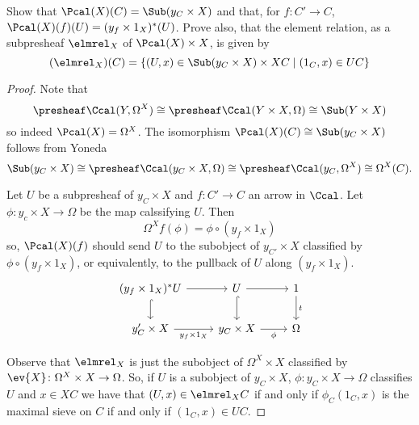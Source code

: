 \begin{exercise}{7}
    Show that $\Pcal(X)(C)=\Sub(y_C\times X)$ and that, for $f\colon C'\to C$, $\Pcal(X)(f)(U)=(y_f\times 1_X)^*(U)$. Prove also, that the element relation, as a subpresheaf $\elmrel_X$ of $\Pcal(X)\times X$, is given by
    \[ (\elmrel_X)(C)=\{(U,x)\in\Sub(y_C\times X)\times XC\mid (1_C,x)\in UC\} \]
\begin{solution}
    \begin{proof}
        Note that
        \[\presheaf\Ccal(Y,\Omega^X)\cong\presheaf\Ccal(Y\times X,\Omega)\cong\Sub(Y\times X)\]
        so indeed $\Pcal(X)=\Omega^X$. The isomorphism $\Pcal(X)(C)\cong\Sub(y_C\times X)$ follows from Yoneda
        \[\Sub(y_C\times X)\cong\presheaf\Ccal(y_C\times X,\Omega)\cong\presheaf\Ccal(y_C,\Omega^X)\cong\Omega^X(C).\]

        Let $U$ be a subpresheaf of $y_C\times X$ and $f\colon C'\to C$ an arrow in $\Ccal$. Let $\phi\colon y_c\times X\to\Omega$ be the map calssifying $U$. Then
        \[\Omega^Xf(\phi)=\phi\circ (y_f\times 1_X)\]
        so, $\Pcal(X)(f)$ should send $U$ to the subobject of $y_{C'}\times X$ classified by $\phi\circ (y_f\times 1_X)$, or equivalently, to the pullback of $U$ along $(y_f\times 1_X)$.
        \[ \begin{tikzcd}
            (y_f\times 1_X)^*U \arrow[d, hook] \arrow[r] & U \arrow[r] \arrow[d, hook]    & 1 \arrow[d, "t"] \\
            y_C'\times X \arrow[r, "y_f\times 1_X"']     & y_C\times X \arrow[r, "\phi"'] & \Omega          
        \end{tikzcd} \]

        Observe that $\elmrel_X$ is just the subobject of $\Omega^X\times X$ classified by $\ev{X}\colon\Omega^X\times X\to\Omega$. So, if $U$ is a subobject of $y_C\times X$, $\phi:y_C\times X\to\Omega$ classifies $U$ and $x\in XC$ we have that $(U,x)\in\elmrel_XC$ if and only if $\phi_C(1_C, x)$ is the maximal sieve on $C$ if and only if $(1_C, x)\in UC$.
    \end{proof}
\end{solution}
\end{exercise}

